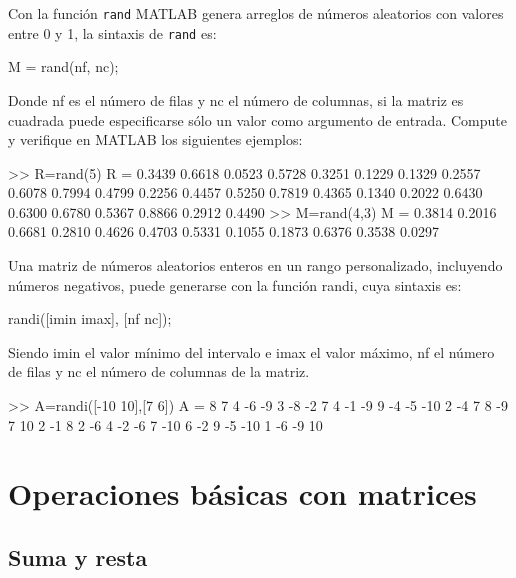 Con la función \texttt{rand} MATLAB genera arreglos de números
aleatorios con valores entre 0 y 1, la sintaxis de \texttt{rand} es:

\begin{matlab}
M = rand(nf, nc);
\end{matlab}

Donde nf es el número de filas y nc el número de columnas, si la matriz
es cuadrada puede especificarse sólo un valor como argumento de entrada.
Compute y verifique en MATLAB los siguientes ejemplos:

\begin{matlab}
>> R=rand(5)
R =
    0.3439    0.6618    0.0523    0.5728    0.3251
    0.1229    0.1329    0.2557    0.6078    0.7994
    0.4799    0.2256    0.4457    0.5250    0.7819
    0.4365    0.1340    0.2022    0.6430    0.6300
    0.6780    0.5367    0.8866    0.2912    0.4490
>> M=rand(4,3)
M =
    0.3814    0.2016    0.6681
    0.2810    0.4626    0.4703
    0.5331    0.1055    0.1873
    0.6376    0.3538    0.0297
\end{matlab}

Una matriz de números aleatorios enteros en un rango personalizado,
incluyendo números negativos, puede generarse con la función randi, cuya
sintaxis es:

\begin{matlab}
randi([imin imax], [nf nc]);
\end{matlab}

Siendo imin el valor mínimo del intervalo e imax el valor máximo, nf el
número de filas y nc el número de columnas de la matriz.

\begin{matlab}
>> A=randi([-10 10],[7 6])
A =
     8     7     4    -6    -9     3
    -8    -2     7     4    -1    -9
     9    -4    -5   -10     2    -4
     7     8    -9     7    10     2
    -1     8     2    -6     4    -2
    -6     7   -10     6    -2     9
    -5   -10     1    -6    -9    10
\end{matlab}

\section{Operaciones básicas con matrices}\label{operaciones-basicas-con-matrices}

\subsection{Suma y resta}\label{suma-y-resta}

